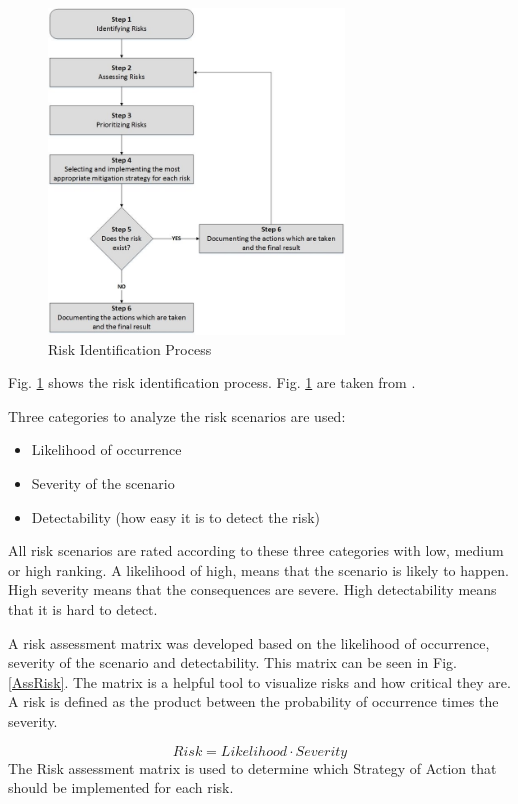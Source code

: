 \begin{figure}[H]
    \centering
    \includegraphics[width = 0.7\textwidth]{VAPIQ-PICTURES/riskprocess.jpg}
    \caption{Risk Identification Process}
    \label{fig:riskid}
\end{figure}
\clearpage
\noindent
Fig. \ref{fig:riskid} shows the risk identification process. Fig. \ref{fig:riskid} are taken from \cite{Alberto}.

\bigskip
Three categories to analyze the risk scenarios are used:
\begin{itemize}
\item{Likelihood of occurrence}
\item{Severity of the scenario}
\item{Detectability (how easy it is to detect the risk)}
\end{itemize}
All risk scenarios are rated according to these three categories with low, medium or high ranking. A likelihood of high, means that the scenario is likely to happen. High severity means that the consequences are severe. High detectability means that it is hard to detect.\bigskip

A risk assessment matrix was developed based on the likelihood of occurrence, severity of the scenario and detectability. This matrix can be seen in Fig. \ref{AssRisk}. The matrix is a helpful tool to visualize risks and how critical they are. A risk is defined as the product between the probability of occurrence times the severity. 

$$Risk = Likelihood\cdot Severity$$ 
\medskip
The Risk assessment matrix is used to determine which Strategy of Action that should be implemented for each risk. 

